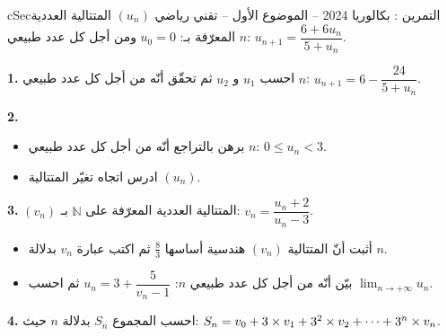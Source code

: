 \documentclass[12pt,a4paper]{article}
\newenvironment{BOX}[2]{\begin{otherlanguage}{english}\begin{arbox}{#1}{#2}}{\end{arbox}\end{otherlanguage}}
\newcounter{exo}
\newenvironment{tamrin}[1]{\stepcounter{exo}\begin{BOX}{cSec}{التمرين \theexo: #1}}{\end{BOX}}
\renewcommand{\cdots}{\mathinner{\cdotp\cdotp\cdotp}}
\newcommand{\N}{\mathbb{N}}
\newcommand{\limn}{\displaystyle\lim_{n\to+\infty}}
\newenvironment{sq}{\begin{itemize}[leftmargin=2.4em,itemsep=3pt]}{\end{itemize}}
\newcommand{\qa}{\item[(أ)]}\newcommand{\qb}{\item[(ب)]}\newcommand{\qc}{\item[(جـ)]}\newcommand{\qd}{\item[(د)]}\newcommand{\qe}{\item[(هـ)]}
\begin{document}
\begin{tamrin}{بكالوريا 2024 -- الموضوع الأول -- تقني رياضي}
$(u_n)$ المتتالية العددية المعرّفة بـ: $u_0=0$ ومن أجل كل عدد طبيعي $n$: $u_{n+1}=\dfrac{6+6u_n}{5+u_n}$.

\textbf{1.} احسب $u_1$ و $u_2$ ثم تحقّق أنّه من أجل كل عدد طبيعي $n$: $u_{n+1}=6-\dfrac{24}{5+u_n}$.

\textbf{2.}
\begin{sq}
\qa برهن بالتراجع أنّه من أجل كل عدد طبيعي $n$: $0\le u_n<3$.
\qb ادرس اتجاه تغيّر المتتالية $(u_n)$.
\end{sq}
\textbf{3.} $(v_n)$ المتتالية العددية المعرّفة على $\N$ بـ: $v_n=\dfrac{u_n+2}{u_n-3}$.
\begin{sq}
\qa أثبت أنّ المتتالية $(v_n)$ هندسية أساسها $\frac83$ ثم اكتب عبارة $v_n$ بدلالة $n$.
\qb بيّن أنّه من أجل كل عدد طبيعي $n$: $u_n=3+\dfrac{5}{v_n-1}$ ثم احسب $\limn u_n$.
\end{sq}
\textbf{4.} احسب المجموع $S_n$ بدلالة $n$ حيث: $S_n=v_0+3\times v_1+3^2\times v_2+\cdots+3^n\times v_n$.
\end{tamrin}
\end{document}
